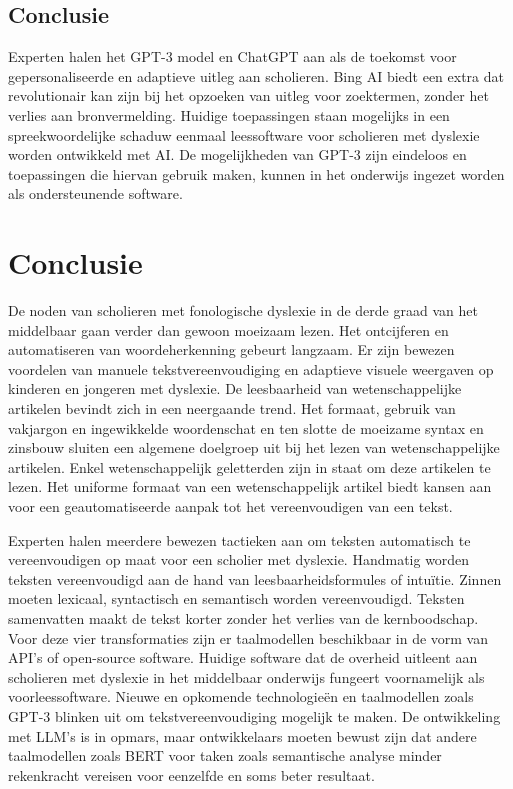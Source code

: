 \subsection{Conclusie}

Experten halen het GPT-3 model en ChatGPT aan als de toekomst voor gepersonaliseerde en adaptieve uitleg aan scholieren. Bing AI biedt een extra dat revolutionair kan zijn bij het opzoeken van uitleg voor zoektermen, zonder het verlies aan bronvermelding. Huidige toepassingen staan mogelijks in een spreekwoordelijke schaduw eenmaal leessoftware voor scholieren met dyslexie worden ontwikkeld met AI. De mogelijkheden van GPT-3 zijn eindeloos en toepassingen die hiervan gebruik maken, kunnen in het onderwijs ingezet worden als ondersteunende software.

\section{Conclusie}

De noden van scholieren met fonologische dyslexie in de derde graad van het middelbaar gaan verder dan gewoon moeizaam lezen.  Het ontcijferen en automatiseren van woordeherkenning gebeurt langzaam. Er zijn bewezen voordelen van manuele tekstvereenvoudiging en adaptieve visuele weergaven op kinderen en jongeren met dyslexie. De leesbaarheid van wetenschappelijke artikelen bevindt zich in een neergaande trend. Het formaat, gebruik van vakjargon en ingewikkelde woordenschat en ten slotte de moeizame syntax en zinsbouw sluiten een algemene doelgroep uit bij het lezen van wetenschappelijke artikelen. Enkel wetenschappelijk geletterden zijn in staat om deze artikelen te lezen. Het uniforme formaat van een wetenschappelijk artikel biedt kansen aan voor een geautomatiseerde aanpak tot het vereenvoudigen van een tekst.

Experten halen meerdere bewezen tactieken aan om teksten automatisch te vereenvoudigen op maat voor een scholier met dyslexie. Handmatig worden teksten vereenvoudigd aan de hand van leesbaarheidsformules of intuïtie. Zinnen moeten lexicaal, syntactisch en semantisch worden vereenvoudigd. Teksten samenvatten maakt de tekst korter zonder het verlies van de kernboodschap. Voor deze vier transformaties zijn er taalmodellen beschikbaar in de vorm van API's of open-source software. Huidige software dat de overheid uitleent aan scholieren met dyslexie in het middelbaar onderwijs fungeert voornamelijk als voorleessoftware. Nieuwe en opkomende technologieën en taalmodellen zoals GPT-3 blinken uit om tekstvereenvoudiging mogelijk te maken. De ontwikkeling met LLM's is in opmars, maar ontwikkelaars moeten bewust zijn dat andere taalmodellen zoals BERT voor taken zoals semantische analyse minder rekenkracht vereisen voor eenzelfde en soms beter resultaat. 